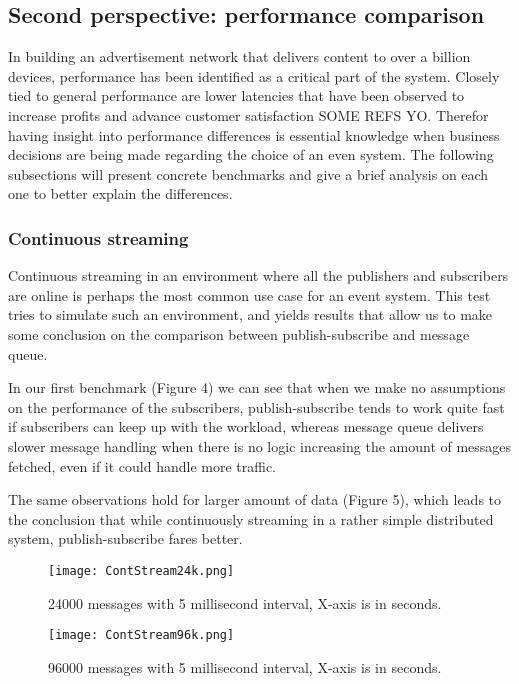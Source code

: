 \documentclass[conference]{IEEEtran}
\begin{document}
\subsection{Second perspective: performance comparison}
In building an advertisement network that delivers content to over a billion devices, performance has been identified as a critical part of the system. Closely tied to general performance are lower latencies that have been observed to increase profits and advance customer satisfaction SOME REFS YO. Therefor having insight into performance differences is essential knowledge when business decisions are being made regarding the choice of an even system.
The following subsections will present concrete benchmarks and give a brief analysis on each one to better explain the differences.

\subsubsection{Continuous streaming}
Continuous streaming in an environment where all the publishers and subscribers are online is perhaps the most common use case for an event system. This test tries to simulate such an environment, and yields results that allow us to make some conclusion on the comparison  between publish-subscribe and message queue.

In our first benchmark (Figure 4) we can see that when we make no assumptions on the performance of the subscribers, publish-subscribe tends to work quite fast if subscribers can keep up with the workload, whereas message queue delivers slower message handling when there is no logic increasing the amount of messages fetched, even if it could handle more traffic.

The same observations hold for larger amount of data (Figure 5), which leads to the conclusion that while continuously streaming in a rather simple distributed system, publish-subscribe fares better.

\begin{figure}[h]
    \centering
    \texttt{[image: ContStream24k.png]}
    \caption{24000 messages with 5 millisecond interval, X-axis is in seconds.}
\end{figure}

\begin{figure}[h]
    \centering
    \texttt{[image: ContStream96k.png]}
    \caption{96000 messages with 5 millisecond interval, X-axis is in seconds.}
\end{figure}
\end{document}
